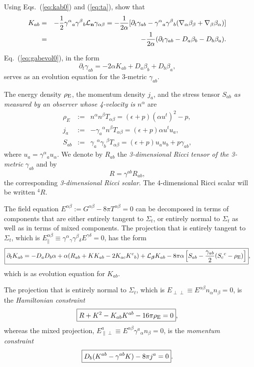 \documentclass[12pt]{article}
\def\d{\delta}
\def\a{\alpha}
\def\b{\beta}
\def\g{\gamma}
\def\Lie{{\cal L}}
\def\be{\begin{equation}}
\def\ee{\end{equation}}
\def\a{\alpha}
\def\b{\beta}
\def\c{\gamma}
\def\d{\delta}
\newcommand{\bsube}{\begin{subequations}}
\newcommand{\esube}{\end{subequations}}
\def\bea{\begin{eqnarray}}
\def\eea{\end{eqnarray}}
\begin{document}
{ Using Eqs.~(\ref{eq:kab0}) and (\ref{eq:ta}), show that 
\bea
 K_{ab} &=& -\frac12\gamma^\a{}_a \gamma^\b{}_b \Lie_{\bf n} \gamma_{\a\b}
 = -\frac1{2\alpha} [\partial_t \gamma_{ab}
          -\gamma^\alpha{}_a \gamma^\beta{}_b (\nabla_\a \b_\b + \nabla_\b \b_\a)]
\nonumber\\
 &=& -\frac1{2\alpha} (\partial_t \gamma_{ab}
          -D_a \b_b - D_b \b_a).
\label{eq:gabevol0}\eea 

\vskip0.5cm 
Eq.~(\ref{eq:gabevol0}), in the form
\be
\boxed{\partial_t \gamma_{ab} = -2\a K_{ab} +D_a \b_b + D_b \b_a},
\label{eq:gabevol}\ee
serves as an evolution equation for the 3-metric $\gamma_{ab}$. 

The energy density  $\rho_{\rm E}$,
the momentum density $j_a$, and the stress tensor {\it $S_{ab}$ as measured by an observer
whose 
4-velocity is $n^\alpha$} are  
\bsube\bea
  \rho_E &:=& n^\a n^\b T_{\a\b} = (\epsilon+p)(\alpha u^t)^2-p,\\
  j_a    &:=& -\g_a{}^\a n^\b T_{\a\b} = (\epsilon+p) \alpha u^t u_a, \\
  S_{ab} &:=& \g_a{}^\a \g_b{}^\b T_{\a\b} 
        = (\epsilon+p) u_a u_b + p\gamma_{ab}, 
\eea\label{eq:tdecomp}
\esube 
\noindent where $u_a = \gamma^\a{}_a u_\a$. 
We denote by $R_{ab}$ the \textit{3-dimensional 
Ricci tensor of the 3-metric} $\gamma_{ab}$ and by 
\be
        R = \gamma^{ab}R_{ab},
\ee
the corresponding \textit{3-dimensional Ricci scalar}.  The 4-dimensional Ricci scalar 
will be written $^4\!R$.  

The field equation \mbox{$E^{\a\b}:=G^{\a\b}-8\pi T^{\a\b}=0$} can be decomposed in terms of components that are either entirely tangent to  $\Sigma_t$, or entirely normal to $\Sigma_t$ as well as in terms of mixed components. The
projection that is entirely tangent to  $\Sigma_t$, which is
$E_\parallel^{\a\b} \equiv \gamma^\a{}_\c \gamma^\b{}_\d E^{\c\d}=0$, 
has the form
\be
\boxed{\partial_t K_{ab} = -D_{a}D_{b}\alpha 
+ \alpha ( R_{ab} + K K_{ab}  - 2 K_{ac}K^{c}{}_{b})
+ \Lie_{\bm \b}K_{ab} 
 -8\pi\alpha\left[S_{ab}-\frac{\gamma_{ab}}{2}(S_c{}^c-\rho_{\rm E})
\right]},
\label{eq:Kabevol}
\ee
which is as evolution equation for $K_{ab}$.

The projection that is entirely normal to $\Sigma_t$, which is $E_{\perp\perp}\equiv E^{\a\b}n_\a n_\b=0$, is the {\it Hamiltonian constraint} 
\be
\boxed{ R+K^2-K_{ab}K^{ab}-16\pi\rho_{\rm E} = 0}, 
\index{Hamiltonian constraint}\label{eq:Hamconstraint}
\ee
whereas the mixed projection,
$E^a_{\parallel\perp}\equiv E^{\a\b}\g^a{}_\a n_\b=0$, is the {\it momentum constraint}
\be 
\boxed{D_b(K^{ab}-\gamma^{ab}K) -8 \pi j^a = 0}. 
\index{Momentum constraint}\label{eq:momconstraint}
\ee


}
\end{document}

